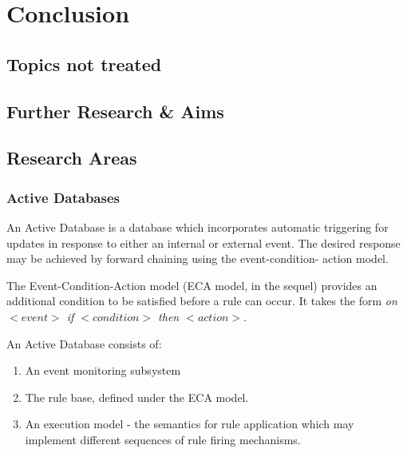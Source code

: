 \chapter{Conclusion}\label{chap:conc}

\section{Topics not treated}

\section{Further Research \& Aims}
\section{Research Areas}

\subsection{Active Databases}

An Active Database is a database which incorporates automatic triggering
for updates in response to either an internal or external event.  The desired
response may be achieved by forward chaining using the event-condition-
action model.
\begin{definition}
\begin{rm}
The Event-Condition-Action model (ECA model, in the sequel)
provides an additional condition to be satisfied before a rule can
occur. It takes the form {\em on $ <event>$ if $<condition>$ then $<action>$}.
\end{rm}
\end{definition}


\begin{definition}
\begin{rm}
An Active Database consists of:
\begin{enumerate}
\item An event monitoring subsystem
\item The rule base, defined under the ECA model.
\item An execution model - the semantics for rule application which may
implement different sequences of rule firing mechanisms.
\end{enumerate}
\end{rm}
\end{definition}

